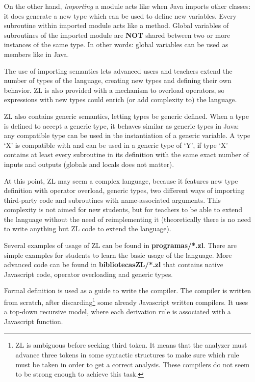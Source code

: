 \documentclass{report}
\begin{document}
	On the other hand, \textit{importing} a module acts like when Java imports other classes: it does generate a new type which can be used to define new variables. Every subroutine within imported module acts like a method. Global variables of subroutines of the imported module are \textbf{NOT} shared between two or more instances of the same type. In other words: global variables can be used as members like in Java. 
	
	The use of importing semantics lets advanced users and teachers extend the number of types of the language, creating new types and defining their own behavior. ZL is also provided with a mechanism to overload operators, so expressions with new types could enrich (or add complexity to) the language. 
	
	ZL also contains generic semantics, letting types be generic defined. When a type is defined to accept a generic type, it behaves similar as generic types in Java: any compatible type can be used in the instantiation of a generic variable. A type `X' is compatible with and can be used in a generic type of `Y', if type `X' contains at least every subroutine in its definition with the same exact number of inputs and outputs (globals and locals does not matter).  
	
	At this point, ZL may seem a complex language, because it features new type definition with operator overload, generic types, two different ways of importing third-party code and subroutines with name-associated arguments. This complexity is not aimed for new students, but for teachers to be able to extend the language without the need of reimplementing it (theoretically there is no need to write anything but ZL code to extend the language). 

	Several examples of usage of ZL can be found in \textbf{programas/*.zl}. There are simple examples for students to learn the basic usage of the language. More advanced code can be found in \textbf{bibliotecasZL/*.zl} that contains native Javascript code, operator overloading and generic types. 
	
	Formal definition is used as a guide to write the compiler. The compiler is written from scratch, after discarding\footnote{ZL is ambiguous before seeking third token. It means that the analyzer must advance three tokens in some syntactic structures to make sure which rule must be taken in order to get a correct analysis. These compilers do not seem to be strong enough to achieve this task.} some already Javascript written compilers. It uses a top-down recursive model, where each derivation rule is associated with a Javascript function. 
	
\end{document}
